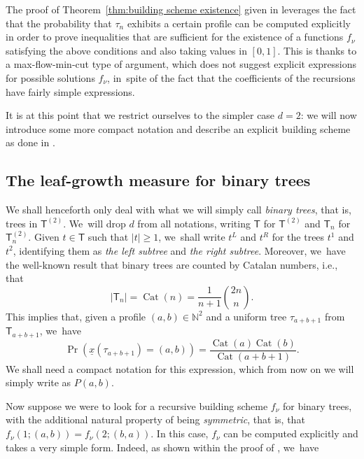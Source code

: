 \documentclass[JEP,XML,SOM,Unicode,NoFloatCountersInSection, NoEqCountersInSection,published]{cedram}
\newcommand{\sT}{\mathsf{T}}
\newcommand{\Cat}{\operatorname{Cat}}
\theoremstyle{definition}
\begin{document}
The proof of Theorem~\ref{thm:building scheme existence} given in \cite{LW04} leverages the fact that the probability that $\tau_n$ exhibits a certain profile can be computed explicitly in order to prove inequalities that are sufficient for the existence of a functions $f_\nu$ satisfying the above conditions and also taking values in $[0,1]$. This is thanks to a max-flow-min-cut type of argument, which does not suggest explicit expressions for possible solutions $f_\nu$, in~spite of the fact that the coefficients of the recursions have fairly simple expressions.

It is at this point that we restrict ourselves to the simpler case $d=2$: we will now introduce some more compact notation and describe an explicit building scheme as done in \cite{CS20}.

\subsection{The leaf-growth measure for binary trees}

We shall henceforth only deal with what we will simply call \emph{binary trees}, that is, trees in $\sT^{(2)}$. We~will drop $d$ from all notations, writing $\sT$ for $\sT^{(2)}$ and $\sT_n$ for $\sT_n^{(2)}$. Given $t\in \sT$ such that $|t|\geq 1$, we~shall write $t^L$ and $t^R$ for the trees $t^1$ and $t^2$, identifying them as \emph{the left subtree} and \emph{the right subtree}. Moreover, we~have the well-known result that binary trees are counted by Catalan numbers, i.e., that
\[
|\sT_n|=\Cat(n)=\frac{1}{n+1}\binom{2n}{n}.
\]
This implies that, given a profile $(a,b)\in\mathbb{N}^2$ and a uniform tree $\tau_{a+b+1}$ from $\sT_{a+b+1}$, we~have
\[
\Pr(\underline{x}(\tau_{a+b+1})=(a,b))=\frac{\Cat(a)\Cat(b)}{\Cat(a+b+1)}.
\]
We shall need a compact notation for this expression, which from now on we will simply write as $P(a,b)$.

Now suppose we were to look for a recursive building scheme $f_\nu$ for binary trees, with the additional natural property of being \emph{symmetric}, that is, that $f_\nu(1;(a,b))=f_\nu(2; (b,a))$. In this case, $f_\nu$ can be computed explicitly and takes a very simple form. Indeed, as shown within the proof of \cite[Prop.\,5.1]{CS20}, we~have
\end{document}
